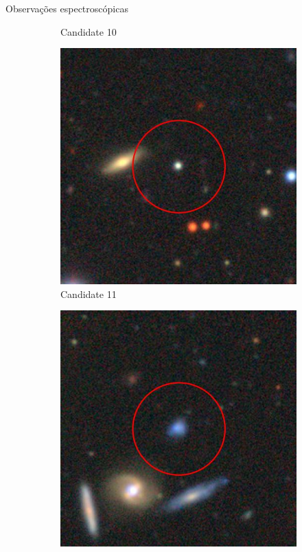 \begin{frame}[c]{Observações espectroscópicas}
\begin{figure}
\begin{subfigure}[b]{0.11\textwidth}
        \caption{Candidate 10}
    \end{subfigure}
    \begin{subfigure}[b]{0.11\textwidth}
        \includegraphics[width=\textwidth]{images/proposatal_candidatas_1/UCG11.jpg}
        \caption{Candidate 11}
    \end{subfigure}
    \begin{subfigure}[b]{0.11\textwidth}
        \includegraphics[width=\textwidth]{images/proposatal_candidatas_1/UCG12.jpg}

\end{subfigure}
\end{figure}
\end{frame}
